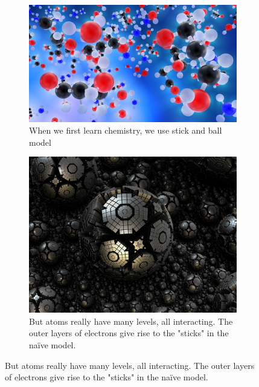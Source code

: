 \documentclass[]{article}
\begin{document}
\begin{figure}[H]
	\caption{Chemical Complexity}\label{fig:ChemicalComplexity} 
	
	\begin{subfigure}[b]{0.45\textwidth}
		\centering
		\caption{When we first learn chemistry, we use stick and ball model}
		\includegraphics[width=\textwidth]{ChemicalComplexity}
	\end{subfigure}
	\begin{subfigure}[b]{0.45\textwidth}
		\centering
		\caption{But atoms really have many levels, all interacting. The outer layers of electrons give rise to the "sticks" in the na\"ive model.}
		\includegraphics[width=\textwidth]{ChemicalComplexity1}
	\end{subfigure}
\end{figure}
\end{document}
